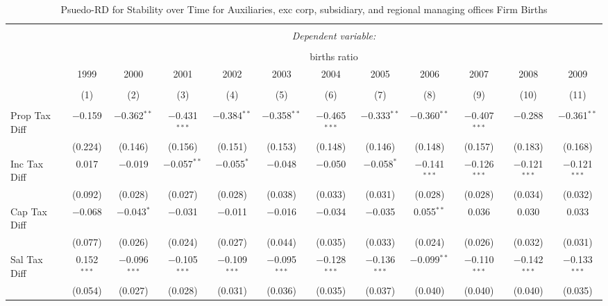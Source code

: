 
\begin{table}[!htbp] \centering 
  \caption{Psuedo-RD for Stability over Time for  Auxiliaries, exc corp, subsidiary, and regional managing offices Firm Births} 
  \label{95year} 
\small 
\begin{tabular}{@{\extracolsep{5pt}}lccccccccccc} 
\\[-1.8ex]\hline 
\hline \\[-1.8ex] 
 & \multicolumn{11}{c}{\textit{Dependent variable:}} \\ 
\cline{2-12} 
\\[-1.8ex] & \multicolumn{11}{c}{births ratio} \\ 
 & 1999 & 2000 & 2001 & 2002 & 2003 & 2004 & 2005 & 2006 & 2007 & 2008 & 2009 \\ 
\\[-1.8ex] & (1) & (2) & (3) & (4) & (5) & (6) & (7) & (8) & (9) & (10) & (11)\\ 
\hline \\[-1.8ex] 
 Prop Tax Diff & $-$0.159 & $-$0.362$^{**}$ & $-$0.431$^{***}$ & $-$0.384$^{**}$ & $-$0.358$^{**}$ & $-$0.465$^{***}$ & $-$0.333$^{**}$ & $-$0.360$^{**}$ & $-$0.407$^{***}$ & $-$0.288 & $-$0.361$^{**}$ \\ 
  & (0.224) & (0.146) & (0.156) & (0.151) & (0.153) & (0.148) & (0.146) & (0.148) & (0.157) & (0.183) & (0.168) \\ 
  Inc Tax Diff & 0.017 & $-$0.019 & $-$0.057$^{**}$ & $-$0.055$^{*}$ & $-$0.048 & $-$0.050 & $-$0.058$^{*}$ & $-$0.141$^{***}$ & $-$0.126$^{***}$ & $-$0.121$^{***}$ & $-$0.121$^{***}$ \\ 
  & (0.092) & (0.028) & (0.027) & (0.028) & (0.038) & (0.033) & (0.031) & (0.028) & (0.028) & (0.034) & (0.032) \\ 
  Cap Tax Diff & $-$0.068 & $-$0.043$^{*}$ & $-$0.031 & $-$0.011 & $-$0.016 & $-$0.034 & $-$0.035 & 0.055$^{**}$ & 0.036 & 0.030 & 0.033 \\ 
  & (0.077) & (0.026) & (0.024) & (0.027) & (0.044) & (0.035) & (0.033) & (0.024) & (0.026) & (0.032) & (0.031) \\ 
  Sal Tax Diff & 0.152$^{***}$ & $-$0.096$^{***}$ & $-$0.105$^{***}$ & $-$0.109$^{***}$ & $-$0.095$^{***}$ & $-$0.128$^{***}$ & $-$0.136$^{***}$ & $-$0.099$^{**}$ & $-$0.110$^{***}$ & $-$0.142$^{***}$ & $-$0.133$^{***}$ \\ 
  & (0.054) & (0.027) & (0.028) & (0.031) & (0.036) & (0.035) & (0.037) & (0.040) & (0.040) & (0.040) & (0.035) \\ 

\end{tabular}
\end{table}
